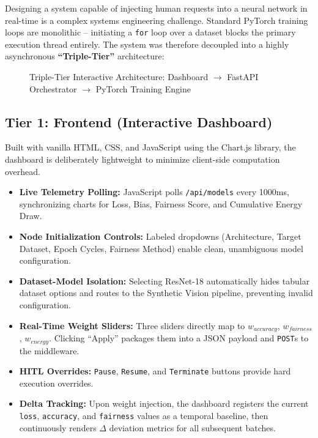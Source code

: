 \documentclass[12pt,a4paper]{article}
\begin{document}
Designing a system capable of injecting human requests into a neural network in real-time is a complex systems engineering challenge. Standard PyTorch training loops are monolithic -- initiating a \texttt{for} loop over a dataset blocks the primary execution thread entirely. The system was therefore decoupled into a highly asynchronous \textbf{``Triple-Tier''} architecture:

\begin{figure}[h]
    \centering
    \caption{Triple-Tier Interactive Architecture: Dashboard $\rightarrow$ FastAPI Orchestrator $\rightarrow$ PyTorch Training Engine}
    \label{fig:triple_tier}
\end{figure}

\subsection{Tier 1: Frontend (Interactive Dashboard)}

Built with vanilla HTML, CSS, and JavaScript using the Chart.js library, the dashboard is deliberately lightweight to minimize client-side computation overhead.

\begin{itemize}
    \item \textbf{Live Telemetry Polling:} JavaScript polls \texttt{/api/models} every 1000ms, synchronizing charts for Loss, Bias, Fairness Score, and Cumulative Energy Draw.
    \item \textbf{Node Initialization Controls:} Labeled dropdowns (Architecture, Target Dataset, Epoch Cycles, Fairness Method) enable clean, unambiguous model configuration.
    \item \textbf{Dataset-Model Isolation:} Selecting ResNet-18 automatically hides tabular dataset options and routes to the Synthetic Vision pipeline, preventing invalid configuration.
    \item \textbf{Real-Time Weight Sliders:} Three sliders directly map to $w_{accuracy}$, $w_{fairness}$, $w_{energy}$. Clicking ``Apply'' packages them into a JSON payload and \texttt{POST}s to the middleware.
    \item \textbf{HITL Overrides:} \texttt{Pause}, \texttt{Resume}, and \texttt{Terminate} buttons provide hard execution overrides.
    \item \textbf{Delta Tracking:} Upon weight injection, the dashboard registers the current \texttt{loss}, \texttt{accuracy}, and \texttt{fairness} values as a temporal baseline, then continuously renders $\Delta$ deviation metrics for all subsequent batches.
\end{itemize}
\end{document}
